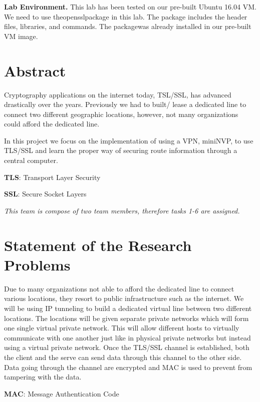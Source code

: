 \documentclass[12pt]{article}
\begin{document}
\textbf{Lab  Environment.} This  lab  has  been  tested  on  our  pre-built  Ubuntu  16.04  VM.  We  need  to  use  theopensslpackage in this lab. The package includes the header files, libraries, and commands. The packagewas already installed in our pre-built VM image.

\clearpage


\section{Abstract}
Cryptography applications on the internet today, TSL/SSL, has advanced drastically over the years. Previously we  had to built/ lease a dedicated line to connect  two different geographic locations, however, not many organizations could afford the dedicated line. 

In this project we focus on the implementation of using a VPN, miniNVP, to use TLS/SSL and learn the proper way of securing route information through a central computer. 

 \item \textbf{TLS}: Transport Layer Security
 \item \textbf{SSL}: Secure Socket Layers
 
 \item \textit{This team is compose of two team members, therefore tasks 1-6 are assigned. }



\section{Statement of the Research Problems}
Due to many organizations not able to afford the dedicated line to connect various locations, they resort to public infrastructure such as the internet. We will be using IP tunneling to build a dedicated virtual line between two different locations. The locations will be given separate private networks which will form one single virtual private network. This will allow different hosts to virtually communicate with one another just like in physical private networks but instead using a virtual private network. Once the TLS/SSL channel is established, both the client and the serve can send data through this channel to the other side. Data going through the channel are encrypted and MAC is used to prevent from tampering with the data. 

\item \textbf{MAC}: Message Authentication Code
\end{document}
